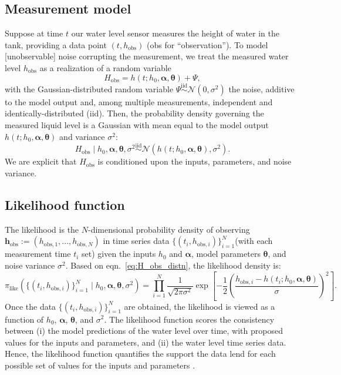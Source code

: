 \documentclass[openacc]{rsproca_new}%
\newcommand\thedata {$\{(t_i,h_{\text{obs}, i})\}_{i=1}^{N}$\xspace}
\newcommand\thedatanomath {\{(t_i,h_{\text{obs}, i})\}_{i=1}^{N}}
\newcommand\themodel {$h(t; h_0, \boldsymbol \alpha, \boldsymbol\theta)$\xspace}
\newcommand\themodelnomath {h(t; h_0, \boldsymbol \alpha, \boldsymbol\theta)}
\begin{document}
\subsection{Measurement model}
Suppose at time $t$ our water level sensor measures the height of water in the tank, providing a data point $(t, h_{\text{obs}})$ (obs for ``observation''). 
To model [unobservable] noise corrupting the measurement, we treat the measured water level $h_{\text{obs}}$ as a realization of a random variable
\begin{equation}
	H_{\text{obs}} = \themodelnomath + \Psi,
\end{equation}
with the Gaussian-distributed random variable $\Psi \overset{\text{iid}}{\sim} \mathcal{N}(0, \sigma^2)$ the noise, additive to the model output and, among multiple measurements, independent and identically-distributed (iid). 
Then, the probability density governing the measured liquid level is a Gaussian with mean equal to the model output \themodel and variance $\sigma^2$:
\begin{equation}
	H_{\text{obs}} \mid h_0, \boldsymbol \alpha, \boldsymbol  \theta, \sigma^2\overset{\text{iid}}{\sim} \mathcal{N}(\themodelnomath, \sigma^2). \label{eq:H_obs_distn}
\end{equation} We are explicit that $H_{\text{obs}}$ is conditioned upon the inputs, parameters, and noise variance.


\subsection{Likelihood function}
The likelihood is the $N$-dimensional probability density of observing $\mathbf{h}_\text{obs}:=(h_{\text{obs},1}, ..., h_{\text{obs},N})$ in time series data \thedata (with each measurement time $t_i$ set) given the inputs $h_0$ and $\boldsymbol \alpha$, model parameters $\boldsymbol \theta$, and noise variance $\sigma^2$. 
Based on eqn.~\ref{eq:H_obs_distn}, the likelihood density is:
\begin{equation}
 \pi_{\text{like}}(\thedatanomath \mid h_0,\boldsymbol  \alpha, \boldsymbol \theta, \sigma^2 ) = \prod_{i=1}^N \frac{1}{\sqrt{2\pi\sigma^2}} \exp \left[-\frac{1}{2}\left(\frac{h_{\text{obs}, i} - h(t_i; h_0, \boldsymbol\alpha, \boldsymbol\theta)}{\sigma} \right)^2 \right]. \label{eq:like}
\end{equation}
Once the data \thedata are obtained, the likelihood is viewed as a function of $h_0$, $\boldsymbol \alpha$, $\boldsymbol \theta$, and $\sigma^2$. The likelihood function scores the consistency between (i) the model predictions of the water level over time, with proposed values for the inputs and parameters, and (ii) the water level time series data. Hence, the likelihood function quantifies the support the data lend for each possible set of values for the inputs and parameters \cite{van2021bayesian}. 
\end{document}
